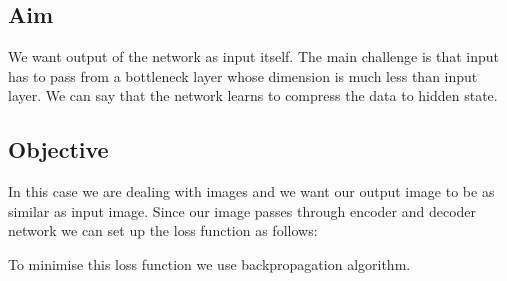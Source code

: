 \documentclass[10pt,a4paper,twoside]{tau-book}
\begin{document}
\subsection{Aim}
We want output of the network as input itself. The main challenge is that input has to pass from a bottleneck layer whose dimension is much less than input layer. We can say that the network learns to compress the data to hidden state.

\subsection{Objective}
In this case we are dealing with images and we want our output image to be as similar as input image. Since our image passes through encoder and decoder network we can set up the loss function as follows:


To minimise this loss function we use backpropagation algorithm.
\end{document}
